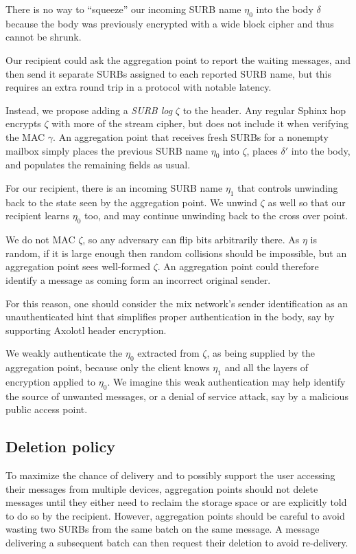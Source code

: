 \documentclass[twoside,letterpaper]{llncs}
\begin{document}
There is no way to ``squeeze'' our incoming SURB name $\eta_0$ into
the body $\delta$ because the body was previously encrypted with a
wide block cipher and thus cannot be shrunk.

Our recipient could ask the aggregation point to report the waiting
messages, and then send it separate SURBs assigned to each reported
SURB name, but this requires an extra round trip in a protocol with
notable latency. 

Instead, we propose adding a {\it SURB log} $\zeta$ to the header.
Any regular Sphinx hop encrypts $\zeta$ with more of the stream
cipher, but does not include it when verifying the MAC $\gamma$.
An aggregation point that receives fresh SURBs for a nonempty
mailbox simply places the previous SURB name $\eta_0$ into $\zeta$,
places $\delta'$ into the body, and populates the remaining fields
as usual.

For our recipient, there is an incoming SURB name $\eta_1$ that 
controls unwinding back to the state seen by the aggregation point.
We unwind $\zeta$ as well so that our recipient learns $\eta_0$ too,
and may continue unwinding back to the cross over point.

We do not MAC $\zeta$, so any adversary can flip bits arbitrarily
there.  As $\eta$ is random, if it is large enough then random
collisions should be impossible, but an aggregation point sees
well-formed $\zeta$.  An aggregation point could therefore identify
a message as coming form an incorrect original sender.

For this reason, one should consider the mix network's sender
identification as an unauthenticated hint that simplifies proper
authentication in the body, say by supporting Axolotl header
encryption.  

We weakly authenticate the $\eta_0$ extracted from $\zeta$,
as being supplied by the aggregation point, because only the client
knows $\eta_1$ and all the layers of encryption applied to $\eta_0$.  
We imagine this weak authentication may help identify the source of
unwanted messages, or a denial of service attack, say by a malicious
public access point.

\subsection{Deletion policy}

To maximize the chance of delivery and to possibly support the user
accessing their messages from multiple devices, aggregation points
should not delete messages until they either need to reclaim the
storage space or are explicitly told to do so by the recipient.
However, aggregation points should be careful to avoid wasting two
SURBs from the same batch on the same message.  A message delivering a
subsequent batch can then request their deletion to avoid re-delivery.
\end{document}
